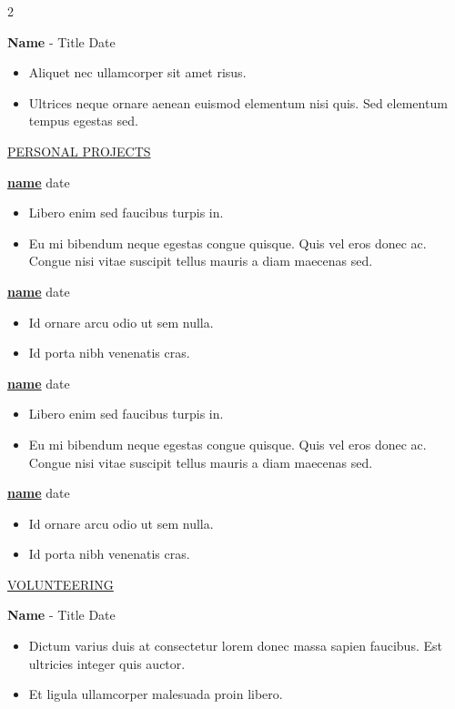 \documentclass[11pt]{article}
\newcommand{\betteruline}[1]{
    \uline{#1}
}
\newcommand{\sectiontitle}[1]{
    \begingroup
        \titlebold
        \betteruline{\Large\uppercase{#1}  }
        \vspace{1.7mm}
    \endgroup
}
\newcommand{\sectioncontent}[1]{
    \begingroup
        \begin{FlushLeft}
        \vspace{-3mm}
        \sffamily\small#1
        \end{FlushLeft}
    \endgroup
    \vspace{2mm}
}
\newcommand{\job}[3]{
    \begingroup
        \textbf{\small#1} - \small#2
        \hfill\color{black!70}\small{#3}
    \endgroup
}
\newcommand{\project}[2]{
    \begingroup
        \textbf{\small#1}
        \hfill\color{black!70}\small{#2}
    \endgroup
}
\newcommand{\spacevv}{
    \vspace{2mm}
}
\begin{document}
\begin{paracol}{2}
{		\job{Name}{Title}{Date}
		\begin{itemize}
			\item Aliquet nec ullamcorper sit amet risus.
			\item Ultrices neque ornare aenean euismod elementum nisi quis. Sed elementum tempus egestas sed.
		\end{itemize}
	}

	\sectiontitle{personal projects}
	\sectioncontent{

		\project{\href{example.com}{name}}{date}
		\begin{itemize}
			\item  Libero enim sed faucibus turpis in.
			\item Eu mi bibendum neque egestas congue quisque. Quis vel eros donec ac. Congue nisi vitae suscipit tellus mauris a diam maecenas sed.
		\end{itemize}
		\spacevv

		\project{\href{example.com}{name}}{date}
		\begin{itemize}
			\item Id ornare arcu odio ut sem nulla.
			\item Id porta nibh venenatis cras.
		\end{itemize}
		\spacevv

		\project{\href{example.com}{name}}{date}
		\begin{itemize}
			\item  Libero enim sed faucibus turpis in.
			\item Eu mi bibendum neque egestas congue quisque. Quis vel eros donec ac. Congue nisi vitae suscipit tellus mauris a diam maecenas sed.
		\end{itemize}
		\spacevv

		\project{\href{example.com}{name}}{date}
		\begin{itemize}
			\item Id ornare arcu odio ut sem nulla.
			\item Id porta nibh venenatis cras.
		\end{itemize}
		\spacevv
	}

	\sectiontitle{volunteering}
	\sectioncontent{

		\job{Name}{Title}{Date}
		\begin{itemize}
			\item Dictum varius duis at consectetur lorem donec massa sapien faucibus. Est ultricies integer quis auctor.
			\item Et ligula ullamcorper malesuada proin libero.
		\end{itemize}
		\spacevv

}
\end{paracol}
\end{document}
